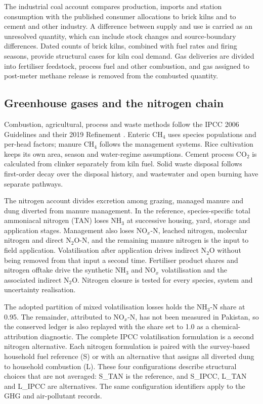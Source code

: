 \documentclass[essd,manuscript]{copernicus}
\begin{document}
The industrial coal account compares production, imports and station consumption with the published consumer allocations to brick kilns and to cement and other industry. A difference between supply and use is carried as an unresolved quantity, which can include stock changes and source-boundary differences. Dated counts of brick kilns, combined with fuel rates and firing seasons, provide structural cases for kiln coal demand. Gas deliveries are divided into fertiliser feedstock, process fuel and other combustion, and gas assigned to post-meter methane release is removed from the combusted quantity.

\subsection{Greenhouse gases and the nitrogen chain}
Combustion, agricultural, process and waste methods follow the IPCC 2006 Guidelines and their 2019 Refinement \citep{IPCC2006,IPCC2019}. Enteric CH$_4$ uses species populations and per-head factors; manure CH$_4$ follows the management systems. Rice cultivation keeps its own area, season and water-regime assumptions. Cement process CO$_2$ is calculated from clinker separately from kiln fuel. Solid waste disposal follows first-order decay over the disposal history, and wastewater and open burning have separate pathways.

The nitrogen account divides excretion among grazing, managed manure and dung diverted from manure management. In the reference, species-specific total ammoniacal nitrogen (TAN) loses NH$_3$ at successive housing, yard, storage and application stages. Management also loses NO$_x$-N, leached nitrogen, molecular nitrogen and direct N$_2$O-N, and the remaining manure nitrogen is the input to field application. Volatilisation after application drives indirect N$_2$O without being removed from that input a second time. Fertiliser product shares and nitrogen offtake drive the synthetic NH$_3$ and NO$_x$ volatilisation and the associated indirect N$_2$O. Nitrogen closure is tested for every species, system and uncertainty realisation.

The adopted partition of mixed volatilisation losses holds the NH$_3$-N share at 0.95. The remainder, attributed to NO$_x$-N, has not been measured in Pakistan, so the conserved ledger is also replayed with the share set to 1.0 as a chemical-attribution diagnostic. The complete IPCC volatilisation formulation is a second nitrogen alternative. Each nitrogen formulation is paired with the survey-based household fuel reference (S) or with an alternative that assigns all diverted dung to household combustion (L). These four configurations describe structural choices that are not averaged: S\_TAN is the reference, and S\_IPCC, L\_TAN and L\_IPCC are alternatives. The same configuration identifiers apply to the GHG and air-pollutant records.
\end{document}
